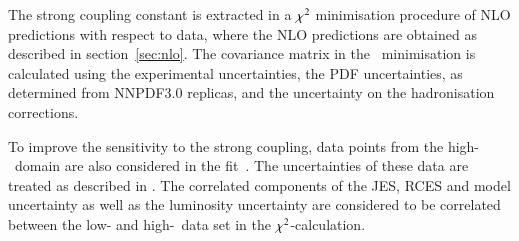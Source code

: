 \documentclass[12pt]{article}
\begin{document}
The strong coupling constant is extracted in a $\chisq$ minimisation procedure of NLO predictions with respect to data, where
the NLO predictions are obtained as described in section~\ref{sec:nlo}.
The covariance matrix in the \chisq\ minimisation is calculated using the experimental uncertainties,
the PDF uncertainties, as determined from NNPDF3.0 replicas, and the uncertainty on the hadronisation corrections.

To improve the sensitivity to the strong coupling, data points from the high-\Qsq\ domain are also considered in the fit~\cite{H1Multijets}.
The uncertainties of these data are treated as described in \cite{H1Multijets}.
The correlated components of the JES, RCES and model uncertainty as well as the luminosity uncertainty are considered to be correlated between
the low- and high-\Qsq\ data set in the $\chisq$-calculation.
\end{document}
